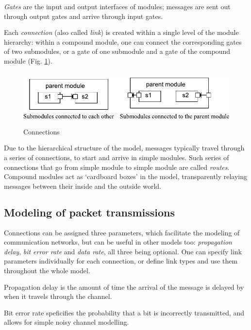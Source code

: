 \textit{Gates} are the input and output interfaces of
modules; messages are sent out through output gates and arrive through
input gates.

Each \textit{connection} (also called
\textit{link}) is created within a single level of the
module hierarchy: within a compound module, one can connect the
corresponding gates of two submodules, or a gate of one submodule and
a gate of the compound module (Fig.
\ref{fig:ch-overview:connections}).

\begin{figure}[htbp]
\begin{center}
\includegraphics[width=5.061in, height=1.121in]{figures/usmanFig3}
\caption{Connections}
\label{fig:ch-overview:connections}
\end{center}
\end{figure}

Due to the hierarchical structure of the model, messages typically
travel through a series of connections, to start and arrive in simple
modules. Such series of connections that go from simple module to
simple module are called \textit{routes}.  Compound modules act as
`cardboard boxes' in the model, transparently relaying messages
between their inside and the outside world.


\subsection{Modeling of packet transmissions}

Connections can be assigned three parameters, which facilitate
the modeling of communication networks, but can be useful in
other models too: \textit{propagation delay}, \textit{bit error rate}
and \textit{data rate}, all three being optional. One can specify
link parameters individually for each connection, or define link types
and use them throughout the whole model.

Propagation delay is the amount of time the arrival of
the message is delayed by when it travels through the channel.

Bit error rate speficifies the probability that a bit is incorrectly
transmitted, and allows for simple noisy channel modelling.

